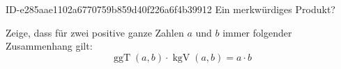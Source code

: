 \begin{exercise}
      {ID-e285aae1102a6770759b859d40f226a6f4b39912}
      {Ein merkwürdiges Produkt?}
  \ifproblem\problem\par
    Zeige, dass für zwei positive ganze Zahlen $a$ und $b$ immer
    folgender Zusammenhang gilt:
    \begin{equation*}
      \operatorname{ggT}(a,b)\cdot\operatorname{kgV}(a,b)
      =
      a\cdot b
    \end{equation*}
  \fi
\end{exercise}
